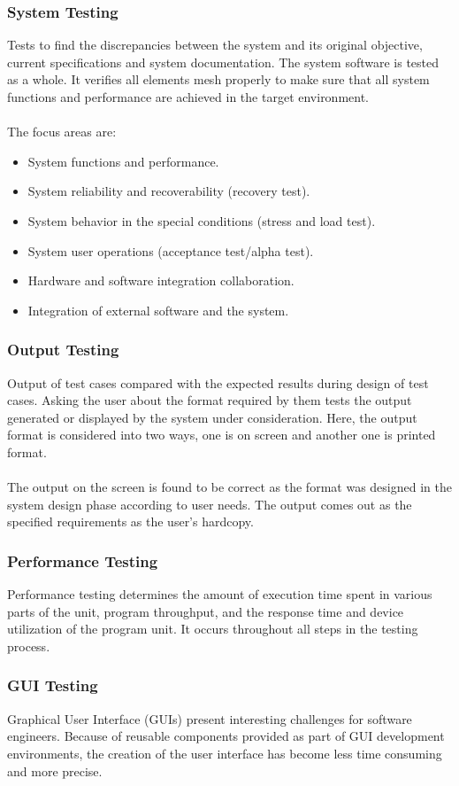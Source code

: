 \documentclass[oneside, 12pt]{book}
\begin{document}
\subsubsection{System Testing}
Tests to find the discrepancies between the system and its original objective, current specifications and system documentation. The system software is tested as a whole. It verifies all elements mesh properly to make sure that all system functions and performance are achieved in the target environment.
\\\\The focus areas are:
\begin{itemize}
	\item System functions and performance.
	\item System reliability and recoverability (recovery test).
	\item System behavior in the special conditions (stress and load test).
	\item System user operations (acceptance test/alpha test).
	\item Hardware and software integration collaboration.
	\item Integration of external software and the system.
\end{itemize}
\subsubsection{Output Testing}
Output of test cases compared with the expected results during design of test cases. Asking the user about the format required by them tests the output generated or displayed by the system under consideration. Here, the output format is considered into two ways, one is on screen and another one is printed format.
\\\\The output on the screen is found to be correct as the format was designed in the system design phase according to user needs. The output comes out as the specified requirements as the user’s hardcopy.
\subsubsection{Performance Testing}
Performance testing determines the amount of execution time spent in various parts of the unit, program throughput, and the response time and device utilization of the program unit. It occurs throughout all steps in the testing process.
\subsubsection{GUI Testing}
Graphical User Interface (GUIs) present interesting challenges for software engineers. Because of reusable components provided as part of GUI development environments, the creation of the user interface has become less time consuming and more precise.
\newpage
\end{document}
